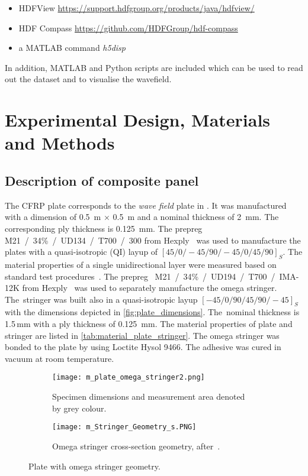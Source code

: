 \documentclass[times,final]{elsarticle}
\begin{document}
\begin{itemize} 
\item HDFView \url{https://support.hdfgroup.org/products/java/hdfview/}
\item HDF Compass \url{https://github.com/HDFGroup/hdf-compass} 
\item a MATLAB command \textit{h5disp}
\end{itemize}

In addition, MATLAB and Python scripts are included which can be used to read out the dataset and to visualise the wavefield. 

\section{Experimental Design, Materials and Methods}

\subsection{Description of composite panel}

The CFRP plate corresponds to the \textit{wave field} plate in \cite{Moll2020}. It was manufactured  with a  dimension of \SI{0.5}{\meter} $\times$ \SI{0.5}{\meter} and a nominal thickness of \SI{2}{\milli\meter}. The
corresponding ply thickness is \SI{0.125}{\milli\meter}. The prepreg  \mbox{M21~/~34\%~/~UD134~/~T700~/~300} from Hexply~\textsuperscript{\textregistered} was used to manufacture the plates with a quasi-isotropic (QI) layup of \mbox{$[45/0/-45/90/-45/0/45/90]_S$}. 
The material properties of a single unidirectional layer were measured based on  standard test procedures~\cite{moll_open_2018}. 
The prepreg \mbox{~M21~/~34\%~/~UD194~/~T700~/~IMA-12K} from Hexply~\textsuperscript{\textregistered} was used to separately manufacture the omega stringer. 
The~stringer was  built also in a quasi-isotropic layup \mbox{$[-45/0/90/45/90/-45]_S$} with the dimensions depicted in \autoref{fig:plate_dimensions}. The~nominal thickness is 1.5\,mm with a ply thickness of \SI{0.125}{\milli\meter}. The material properties of plate and stringer are listed in \autoref{tab:material_plate_stringer}. 
The omega stringer was bonded to the plate by using Loctite Hysol 9466. The adhesive was cured in vacuum at room temperature.

\begin{figure} [h!]
	\centering
	\begin{subfigure}[b]{\textwidth}
	\centering
		\texttt{[image: m\_plate\_omega\_stringer2.png]}
		\caption{Specimen dimensions and measurement area denoted by grey colour.}
		\label{fig:sldv_area}
	\end{subfigure}
	\begin{subfigure}[b]{\textwidth}
	\centering
	\texttt{[image: m\_Stringer\_Geometry\_s.PNG]}
	\caption{Omega stringer cross-section geometry, after~\cite{Moll2020}.}
	\label{fig:stringer_crosssection}
	\end{subfigure}
	\caption{Plate with omega stringer geometry.}
	\label{fig:plate_dimensions}
\end{figure}
\end{document}
